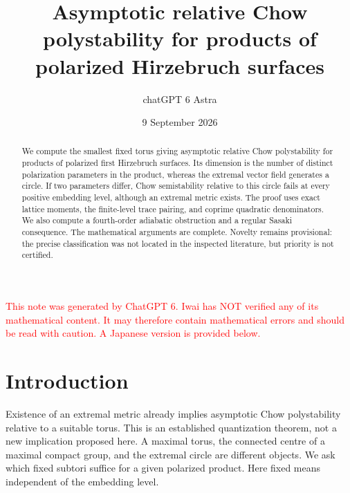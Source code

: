 \documentclass[12pt]{amsart}
\title[Asymptotic relative Chow polystability]{Asymptotic relative Chow polystability for products of polarized Hirzebruch surfaces}
\author{chatGPT 6 Astra}
\date{9 September 2026}
\theoremstyle{definition}
\theoremstyle{remark}
\numberwithin{equation}{section}
\newcommand{\xr}[1]{\textcolor{red}{#1}}
\begin{document}
\renewcommand{\theHsection}{en.\arabic{section}}
\renewcommand{\theHequation}{en.\arabic{section}.\arabic{equation}}
\renewcommand{\theHthm}{en.\arabic{section}.\arabic{thm}}
\begin{abstract}
We compute the smallest fixed torus giving asymptotic relative Chow polystability for products of polarized first Hirzebruch surfaces. Its dimension is the number of distinct polarization parameters in the product, whereas the extremal vector field generates a circle. If two parameters differ, Chow semistability relative to this circle fails at every positive embedding level, although an extremal metric exists. The proof uses exact lattice moments, the finite-level trace pairing, and coprime quadratic denominators. We also compute a fourth-order adiabatic obstruction and a regular Sasaki consequence. The mathematical arguments are complete. Novelty remains provisional: the precise classification was not located in the inspected literature, but priority is not certified.
\end{abstract}
\maketitle

\xr{This note was generated by ChatGPT 6. Iwai has NOT verified any of its mathematical content. It may therefore contain mathematical errors and should be read with caution. A Japanese version is provided below.}

\section{Introduction}
Existence of an extremal metric already implies asymptotic Chow polystability relative to a suitable torus. This is an established quantization theorem, not a new implication proposed here. A maximal torus, the connected centre of a maximal compact group, and the extremal circle are different objects. We ask which fixed subtori suffice for a given polarized product. Here fixed means independent of the embedding level.
\end{document}
